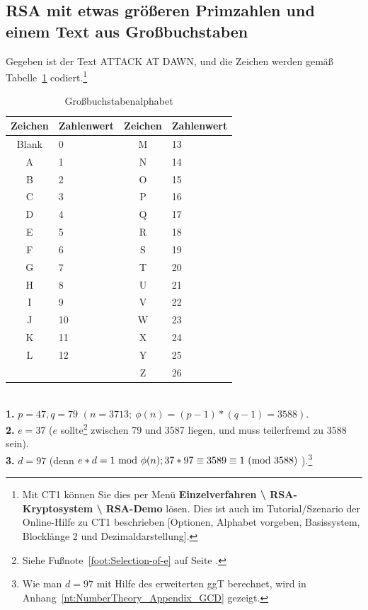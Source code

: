 \begin{refsegment}
\subsection{RSA mit etwas größeren Primzahlen und einem Text aus Großbuchstaben}\label{rsaex2}
Gegeben ist der Text \glqq ATTACK AT DAWN\grqq, und die Zeichen werden gemäß
Tabelle~\ref{alphacode} codiert.\footnote{%
Mit CT1 können Sie dies per Menü
{\bf Einzelverfahren \textbackslash{} RSA-Kryptosystem \textbackslash{} RSA-Demo} lösen.
Dies ist auch im Tutorial/Szenario der Online-Hilfe zu CT1 beschrieben [Optionen,
Alphabet vorgeben, Basissystem, Blocklänge 2 und Dezimaldarstellung].
}

\begin{table}[ht]
\begin{center}
\begin{tabular}{|c|l||c|l|}
\hline
Zeichen & Zahlenwert & Zeichen & Zahlenwert\\
\hline
\hline
Blank    & 0   & M    & 13\\
A        & 1   & N    & 14\\
B        & 2   & O    & 15\\
C        & 3   & P    & 16\\
D        & 4   & Q    & 17\\
E        & 5   & R    & 18\\
F        & 6   & S    & 19\\
G        & 7   & T    & 20\\
H        & 8   & U    & 21\\
I        & 9   & V    & 22\\
J       & 10   & W    & 23\\
K       & 11   & X    & 24\\
L       & 12   & Y    & 25\\
&              & Z    & 26\\
\hline
\end{tabular}
\end{center}
\hypertarget{Grossbuchstaben-Alphabet}{}
\caption{Großbuchstabenalphabet}
\label{alphacode}
\end{table}

\\
{\bf 1.} $p=47, q=79$ $( n= 3713;~ \phi(n) = (p-1)*(q-1)=3588).$\\
{\bf 2.} $e=37$ ($e$ sollte\footnote{%
                Siehe Fußnote~\ref{foot:Selection-of-e} auf Seite
                \pageref{foot:Selection-of-e}.}  zwischen 79 und 3587 liegen,
                und muss teilerfremd
                zu $3588$ sein).\\
{\bf 3.} $d=97$ (denn $e*d=1{\rm ~mod~}\phi(n); 37*97 \equiv 3589
\equiv 1{\rm ~(mod~}3588) \;$).\footnote{%
  Wie man $d = 97$ mit Hilfe des erweiterten ggT berechnet, wird in
  Anhang~\ref{nt:NumberTheory_Appendix_GCD} gezeigt.
}


\end{refsegment}
